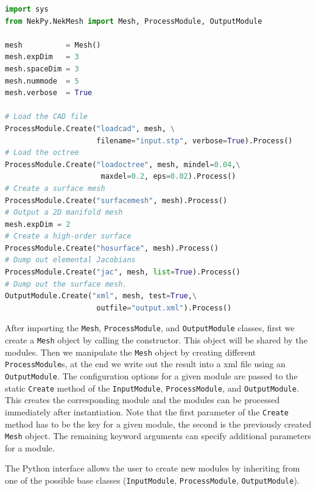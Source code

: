 \begin{lstlisting}[style=C++Style, language=Python]
import sys
from NekPy.NekMesh import Mesh, ProcessModule, OutputModule

mesh          = Mesh()
mesh.expDim   = 3
mesh.spaceDim = 3
mesh.nummode  = 5
mesh.verbose  = True

# Load the CAD file
ProcessModule.Create("loadcad", mesh, \
                     filename="input.stp", verbose=True).Process()
# Load the octree
ProcessModule.Create("loadoctree", mesh, mindel=0.04,\
                      maxdel=0.2, eps=0.02).Process()
# Create a surface mesh
ProcessModule.Create("surfacemesh", mesh).Process()
# Output a 2D manifold mesh
mesh.expDim = 2
# Create a high-order surface
ProcessModule.Create("hosurface", mesh).Process()
# Dump out elemental Jacobians
ProcessModule.Create("jac", mesh, list=True).Process()
# Dump out the surface mesh.
OutputModule.Create("xml", mesh, test=True,\
                     outfile="output.xml").Process()
\end{lstlisting}

After importing the \verb+Mesh+, \verb+ProcessModule+, and \verb+OutputModule+
classes, first we create a \verb+Mesh+ object by calling the constructor.
This object will be shared by the modules.
Then we manipulate the \verb+Mesh+ object by creating different
\verb+ProcessModule+s, at the end we write out the result into a xml file
using an \verb+OutputModule+.
The configuration options for a given module are passed to the static
\verb+Create+ method of the \verb+InputModule+, \verb+ProcessModule+, and
\verb+OutputModule+. This creates the corresponding module and the
modules can be processed immediately after instantiation. Note that the first
parameter of the \verb+Create+ method has to be the key for a given module,
the second is the previously created \verb+Mesh+ object. The remaining keyword
arguments can specify additional parameters for a module.

The Python interface allows the user to create new modules by inheriting from
one of the possible base classes
(\verb+InputModule+, \verb+ProcessModule+, \verb+OutputModule+).

